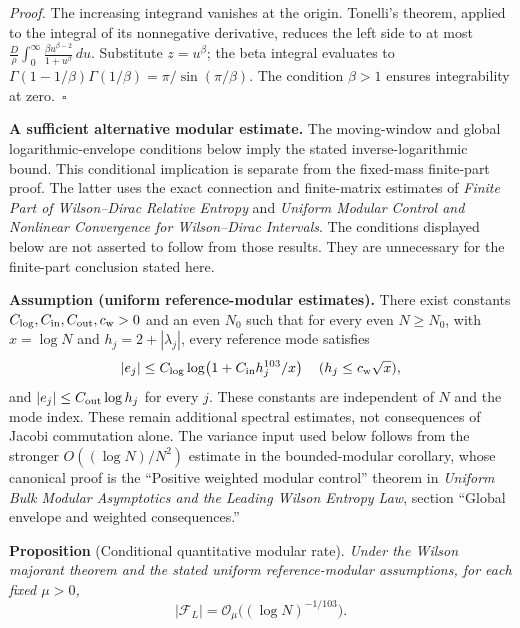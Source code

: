 \documentclass[
  10pt,
  a4paper,
]{article}
\begin{document}
\emph{Proof.} The increasing integrand vanishes at the origin. Tonelli's theorem, applied to the integral of its nonnegative derivative, reduces the left side to at most \(\frac D\rho\int_0^\infty\frac{\beta u^{\beta-2}}{1+u^\beta}\,du\). Substitute \(z=u^\beta\); the beta integral evaluates to \(\Gamma(1-1/\beta)\Gamma(1/\beta)=\pi/\sin(\pi/\beta)\). The condition \(\beta>1\) ensures integrability at zero.~\(\square\)

\textbf{A sufficient alternative modular estimate.} The moving-window and global logarithmic-envelope conditions below imply the stated inverse-logarithmic bound. This conditional implication is separate from the fixed-mass finite-part proof. The latter uses the exact connection and finite-matrix estimates of \emph{Finite Part of Wilson--Dirac Relative Entropy} and \emph{Uniform Modular Control and Nonlinear Convergence for Wilson--Dirac Intervals}. The conditions displayed below are not asserted to follow from those results. They are unnecessary for the finite-part conclusion stated here.

\textbf{Assumption (uniform reference-modular estimates).} There exist constants \(C_{\log},C_{\rm in},C_{\rm out},c_{\rm w}>0\) and an even \(N_0\) such that for every even \(N\ge N_0\), with \(x=\log N\) and \(h_j=2+|\lambda_j|\), every reference mode satisfies \[
|e_j|\le C_{\log}\log\!\left(1+C_{\rm in}h_j^{103}/x\right)
\quad(h_j\le c_{\rm w}\sqrt{x}),
\] and \(|e_j|\le C_{\rm out}\log h_j\) for every \(j\). These constants are independent of \(N\) and the mode index. These remain additional spectral estimates, not consequences of Jacobi commutation alone. The variance input used below follows from the stronger \(O((\log N)/N^2)\) estimate in the bounded-modular corollary, whose canonical proof is the ``Positive weighted modular control'' theorem in \emph{Uniform Bulk Modular Asymptotics and the Leading Wilson Entropy Law}, section ``Global envelope and weighted consequences.''

\label{prop:modrate}
\textbf{Proposition} (Conditional quantitative modular rate). \emph{Under the Wilson majorant theorem and the stated uniform reference-modular assumptions, for each fixed \(\mu>0\), \begin{equation}
\label{eq:modrate}
|\mathcal F_L|=\mathcal O_\mu\bigl((\log N)^{-1/103}\bigr).
\end{equation}}
\end{document}
